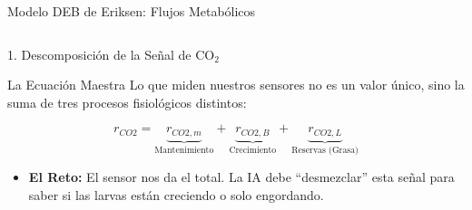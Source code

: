 \documentclass[aspectratio=169, 10pt]{beamer}
\begin{document}
\begin{frame}{Modelo DEB de Eriksen: Flujos Metabólicos}
\begin{columns}[T]
    \end{columns}
\end{frame}

\begin{frame}{1. Descomposición de la Señal de CO$_2$}
    \begin{block}{La Ecuación Maestra }
        Lo que miden nuestros sensores no es un valor único, sino la suma de tres procesos fisiológicos distintos:
    \end{block}

    \vspace{0.2cm}
    \centering
    \large
    \begin{equation}
        r_{CO2} = \underbrace{r_{CO2,m}}_{\text{Mantenimiento}} + \underbrace{r_{CO2,B}}_{\text{Crecimiento}} + \underbrace{r_{CO2,L}}_{\text{Reservas (Grasa)}} \tag{Ec. 14}
    \end{equation}
    \normalsize

    \vspace{0.4cm}
    \begin{itemize}
        \item \textbf{El Reto:} El sensor nos da el total. La IA debe ``desmezclar'' esta señal para saber si las larvas están creciendo o solo engordando.
    \end{itemize}
\end{frame}
\end{document}
